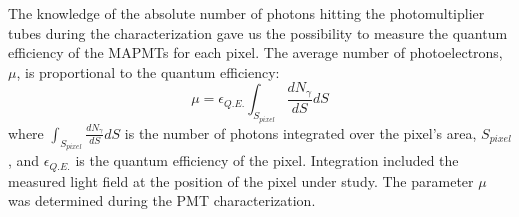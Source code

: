The knowledge of the absolute number of photons hitting the photomultiplier tubes during the characterization gave us the possibility to measure the quantum efficiency of the MAPMTs for each pixel. The average number of photoelectrons, $\mu$, is proportional to the quantum efficiency:
$$
\mu=\epsilon_{Q.E.} \int_{S_{pixel}}\frac {dN_\gamma}{dS} dS
$$
\noindent
where $\int_{S_{pixel}}\frac {dN_\gamma}{dS} dS$ is the number of photons integrated over the pixel's area, $S_{pixel}$, and $\epsilon_{Q.E.}$ is the quantum efficiency of the pixel.
Integration included the measured light field at the position of the pixel under study.
The parameter $\mu$ was determined during the PMT characterization.